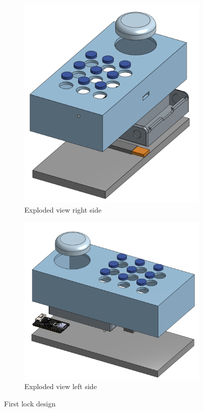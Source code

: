 \begin{figure}[!htbp]
    \centering
    \begin{subfigure}[b]{0.48\textwidth}
        \includegraphics[width=\textwidth]{./img/DFA_Right.png}
        \caption{Exploded view right side}
        \label{fig:DFA_Right}
    \end{subfigure}
    \hfill
    \begin{subfigure}[b]{0.48\textwidth}
        \includegraphics[width=\textwidth]{./img/DFA_Left.png}
        \caption{Exploded view left side}
        \label{fig:DFA_Left}
    \end{subfigure}
    \caption{First lock design}
    \label{fig:DFA_Exploded}
\end{figure}

